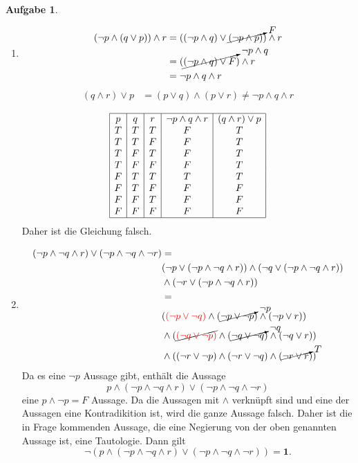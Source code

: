 \documentclass{article}
\theoremstyle{definition}
\newtheorem{ub}{Aufgabe}
\begin{document}
\begin{ub}
	\begin{enumerate}
		\item 
		\begin{align*}
			(\neg p \land (q \lor p)) \land r & = ((\neg p \land q) \lor \cancelto{F}{(\neg p \land p)}) \land r \\
			& = (\cancelto{\neg p \land q}{(\neg p \land q) \lor F}) \land r \\
			& = \neg p \land q \land r 
		\end{align*}
		\begin{align*}
			(q \land r) \lor p & = (p \lor q) \land (p \lor r) \neq \neg p \land q \land r \\
		\end{align*}
		\[ 	\begin{array}{|c|c|c|c|c|}
			\hline
			p & q & r & \neg p \land q \land r & (q \land r) \lor p \\
			T & T & T & F & T \\
			T & T & F & F & T \\
			T & F & T & F & T \\
			T & F & F & F & T \\
			F & T & T & T & T \\
			F & T & F & F & F \\
			F & F & T & F & F \\
			F & F & F & F & F \\ \hline
		\end{array} \]
		Daher ist die Gleichung falsch.
		\item 
		\begin{align*}
			(\neg p \land \neg q \land r) \lor (\neg p \land \neg q \land \neg r) & = \\ 
			& (\neg p \lor (\neg p \land \neg q \land r)) \land (\neg q \lor (\neg p \land \neg q \land r)) \\ & \land (\neg r \lor (\neg p \land \neg q \land r)) \\
			& = \\
			& ({\color{red}(\neg p \lor \neg q)} \land (\cancelto{\neg p}{\neg p \lor \neg p}) \land (\neg p \lor r)) \\
			& \land (\cancel{{\color{red}(\neg q \lor \neg p)}} \land (\cancelto{\neg q}{\neg q \lor \neg q}) \land (\neg q \lor r)) \\
			& \land ((\neg r \lor \neg p) \land (\neg r \lor \neg q) \land (\cancelto{T}{\neg r \lor r})) 
		\end{align*}
	Da es eine $ \neg p $ Aussage gibt, enthält die Aussage
	\[ 
	p \land (\neg p \land \neg q \land r) \lor (\neg p \land \neg q \land \neg r)
	 \]
	eine $ p \land \neg p = F $ Aussage. Da die Aussagen mit $ \land $ verkn\"upft sind und eine der Aussagen eine Kontradikition ist, wird die ganze Aussage falsch. Daher ist die in Frage kommenden Aussage, die eine Negierung von der oben genannten Aussage ist, eine Tautologie. Dann gilt
	\[ 
	\neg (p \land (\neg p \land \neg q \land r) \lor (\neg p \land \neg q \land \neg r)) = \mathbf{1}.
	 \]
	\end{enumerate}
\end{ub}
\end{document}
